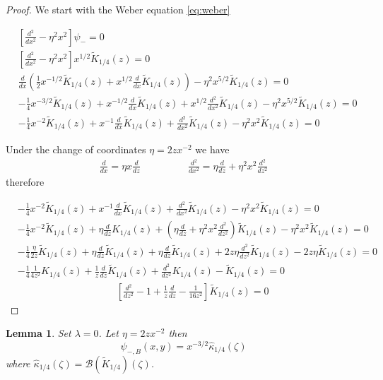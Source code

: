 \documentclass{article}
\theoremstyle{definition}
\theoremstyle{plain}
\newtheorem{lemma}{Lemma}
\begin{document}
\begin{proof}
We start with the Weber equation \eqref{eq:weber}

\begin{align*}
&\left[\frac{d^2}{dx^2}-\eta^2x^2\right]\psi_-=0\\
&\left[\frac{d^2}{dx^2}-\eta^2x^2\right]x^{1/2}\tilde{K}_{1/4}(z)=0\\
&\frac{d}{dx}\left(\frac{1}{2}x^{-1/2}\tilde{K}_{1/4}(z)+x^{1/2}\frac{d}{dx}\tilde{K}_{1/4}(z)\right)-\eta^2x^{5/2}\tilde{K}_{1/4}(z)=0\\
&-\frac{1}{4}x^{-3/2}\tilde{K}_{1/4}(z)+x^{-1/2}\frac{d}{dx}\tilde{K}_{1/4}(z)+x^{1/2}\frac{d^2}{dx^2}\tilde{K}_{1/4}(z)-\eta^2x^{5/2}\tilde{K}_{1/4}(z)=0\\
&-\frac{1}{4}x^{-2}\tilde{K}_{1/4}(z)+x^{-1}\frac{d}{dx}\tilde{K}_{1/4}(z)+\frac{d^2}{dx^2}\tilde{K}_{1/4}(z)-\eta^2x^{2}\tilde{K}_{1/4}(z)=0
\end{align*}

Under the change of coordinates $\eta=2zx^{-2}$ we have
\begin{align*}
\frac{d}{dx}=\eta x\frac{d}{dz} & \qquad \qquad \frac{d^2}{dx^2}=\eta\frac{d}{dz}+\eta^2 x^2\frac{d^2}{dz^2}
\end{align*}
therefore

\begin{align*}
&-\frac{1}{4}x^{-2}\tilde{K}_{1/4}(z)+x^{-1}\frac{d}{dx}\tilde{K}_{1/4}(z)+\frac{d^2}{dx^2}\tilde{K}_{1/4}(z)-\eta^2x^{2}\tilde{K}_{1/4}(z)=0\\
&-\frac{1}{4}x^{-2}\tilde{K}_{1/4}(z)+\eta\frac{d}{dz}K_{1/4}(z)+\left(\eta\frac{d}{dz}+\eta^2 x^2\frac{d^2}{dz^2}\right)\tilde{K}_{1/4}(z)-\eta^2x^{2}\tilde{K}_{1/4}(z)=0\\
&-\frac{1}{4}\frac{\eta}{2z}\tilde{K}_{1/4}(z)+\eta\frac{d}{dz}\tilde{K}_{1/4}(z)+\eta\frac{d}{dz}\tilde{K}_{1/4}(z)+2z\eta \frac{d^2}{dz^2}\tilde{K}_{1/4}(z)-2z\eta \tilde{K}_{1/4}(z)=0\\
&-\frac{1}{4}\frac{1}{4z^2}K_{1/4}(z)+\frac{1}{z}\frac{d}{dz}\tilde{K}_{1/4}(z)+ \frac{d^2}{dz^2}K_{1/4}(z)- \tilde{K}_{1/4}(z)=0\\
&\qquad\qquad\qquad\qquad\qquad \left[\frac{d^2}{dz^2}-1+\frac{1}{z}\frac{d}{dz}-\frac{1}{16 z^2}\right]\tilde{K}_{1/4}(z)=0
\end{align*}


\end{proof}



\begin{lemma}
Set $\lambda=0$. Let $\eta=2zx^{-2}$ then \[\psi_{-,B}(x,y)=x^{-3/2}\hat{\kappa}_{1/4}(\zeta)\] where $\hat{\kappa}_{1/4}(\zeta)=\mathcal{B}(\tilde{K}_{1/4})(\zeta)$. 
\end{lemma}
\end{document}
